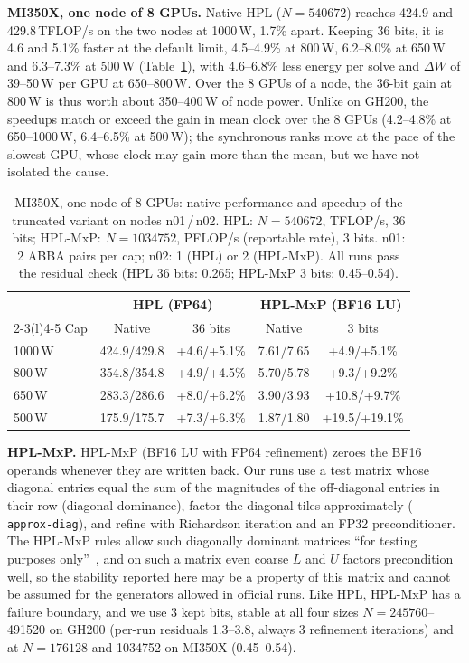 \documentclass[conference]{IEEEtran}
\newcommand{\W}{\,W}
\newcommand{\pct}{\%}
\begin{document}
\textbf{MI350X, one node of 8 GPUs.} Native HPL ($N=540672$) reaches 424.9 and 429.8\,TFLOP/s on the two nodes at
1000\W, 1.7\pct{} apart. Keeping 36 bits, it is 4.6 and 5.1\pct{} faster at the default limit, 4.5--4.9\pct{} at
800\W, 6.2--8.0\pct{} at 650\W{} and 6.3--7.3\pct{} at 500\W{} (Table~\ref{tab:mi350hpl}), with 4.6--6.8\pct{} less
energy per solve and $\Delta W$ of 39--50\W{} per GPU at 650--800\W. Over the 8 GPUs of a node, the 36-bit gain at
800\W{} is thus worth about 350--400\W{} of node power. Unlike on GH200, the speedups match or exceed the gain in mean
clock over the 8 GPUs (4.2--4.8\pct{} at 650--1000\W, 6.4--6.5\pct{} at 500\W); the synchronous ranks move at the pace
of the slowest GPU, whose clock may gain more than the mean, but we have not isolated the cause.

\begin{table}[t]
\caption{MI350X, one node of 8 GPUs: native performance and speedup of the truncated variant on nodes n01\,/\,n02. HPL:
$N=540672$, TFLOP/s, 36 bits; HPL-MxP: $N=1034752$, PFLOP/s (reportable rate), 3 bits. n01: 2 ABBA pairs per cap; n02:
1 (HPL) or 2 (HPL-MxP). All runs pass the residual check (HPL 36 bits: 0.265; HPL-MxP 3 bits: 0.45--0.54).}\label{tab:mi350hpl}
\centering\footnotesize\setlength{\tabcolsep}{2.5pt}
\begin{tabular}{@{}lcccc@{}}
\toprule
& \multicolumn{2}{c}{HPL (FP64)} & \multicolumn{2}{c}{HPL-MxP (BF16 LU)} \\
\cmidrule(lr){2-3}\cmidrule(l){4-5}
Cap & Native & 36 bits & Native & 3 bits \\
\midrule
1000\W & 424.9/429.8 & +4.6/+5.1\pct & 7.61/7.65 & +4.9/+5.1\pct \\
800\W & 354.8/354.8 & +4.9/+4.5\pct & 5.70/5.78 & +9.3/+9.2\pct \\
650\W & 283.3/286.6 & +8.0/+6.2\pct & 3.90/3.93 & +10.8/+9.7\pct \\
500\W & 175.9/175.7 & +7.3/+6.3\pct & 1.87/1.80 & +19.5/+19.1\pct \\
\bottomrule
\end{tabular}
\end{table}

\textbf{HPL-MxP.} HPL-MxP (BF16 LU with FP64 refinement) zeroes the BF16 operands whenever they are written back. Our runs
use a test matrix whose diagonal entries equal the sum of the magnitudes of the off-diagonal entries in their row
(diagonal dominance), factor the diagonal tiles approximately (\texttt{-{}-approx-diag}), and refine with Richardson
iteration and an FP32 preconditioner. The HPL-MxP rules allow such diagonally dominant matrices ``for testing purposes
only''~\cite{HPLMxPRules}, and on such a matrix even coarse $L$ and $U$ factors precondition well, so the stability
reported here may be a property of this matrix and cannot be assumed for the generators allowed in official runs.
Like HPL, HPL-MxP has a failure boundary, and we use 3 kept bits, stable at all four sizes $N=245760$--491520 on GH200
(per-run residuals 1.3--3.8, always 3 refinement iterations) and at $N=176128$ and 1034752 on MI350X (0.45--0.54).
\end{document}
